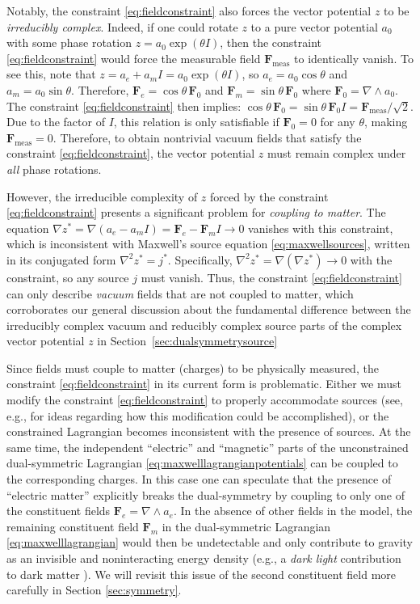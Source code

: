 \documentclass[1p,sort&compress]{elsarticle}
\numberwithin{equation}{section}
\newcommand{\bv}[1]{\mathbf{#1}}
\begin{document}
Notably, the constraint \eqref{eq:fieldconstraint} also forces the vector potential $z$ to be \emph{irreducibly complex}.  Indeed, if one could rotate $z$ to a pure vector potential $a_0$ with some phase rotation $z = a_0\exp(\theta I)$, then the constraint \eqref{eq:fieldconstraint} would force the measurable field $\bv{F}_{\text{meas}}$ to identically vanish.  To see this, note that $z = a_e + a_m I = a_0\exp(\theta I)$, so $a_e = a_0\cos\theta$ and $a_m = a_0\sin\theta$.  Therefore, $\bv{F}_e = \cos\theta\,\bv{F}_0$ and $\bv{F}_m = \sin\theta\,\bv{F}_0$ where $\bv{F}_0 = \nabla\wedge a_0$.  The constraint \eqref{eq:fieldconstraint} then implies: $\cos\theta\,\bv{F}_0 = \sin\theta\,\bv{F}_0 I = \bv{F}_{\text{meas}}/\sqrt{2}$.  Due to the factor of $I$, this relation is only satisfiable if $\bv{F}_0 = 0$ for any $\theta$, making $\bv{F}_{\text{meas}} = 0$.  Therefore, to obtain nontrivial vacuum fields that satisfy the constraint \eqref{eq:fieldconstraint}, the vector potential $z$ must remain complex under \emph{all} phase rotations.  

However, the irreducible complexity of $z$ forced by the constraint \eqref{eq:fieldconstraint} presents a significant problem for \emph{coupling to matter}.  The equation $\nabla z^* = \nabla(a_e - a_m I) = \bv{F}_e - \bv{F}_m I \to 0$ vanishes with this constraint, which is inconsistent with Maxwell's source equation \eqref{eq:maxwellsources}, written in its conjugated form $\nabla^2 z^* = j^*$.  Specifically, $\nabla^2 z^* = \nabla(\nabla z^*) \to 0$ with the constraint, so any source $j$ must vanish.  Thus, the constraint \eqref{eq:fieldconstraint} can only describe \emph{vacuum} fields that are not coupled to matter, which corroborates our general discussion about the fundamental difference between the irreducibly complex vacuum and reducibly complex source parts of the complex vector potential $z$ in Section~\ref{sec:dualsymmetrysource}

Since fields must couple to matter (charges) to be physically measured, the constraint \eqref{eq:fieldconstraint} in its current form is problematic. Either we must modify the constraint \eqref{eq:fieldconstraint} to properly accommodate sources (see, e.g., \cite{Cameron2014} for ideas regarding how this modification could be accomplished), or the constrained Lagrangian becomes inconsistent with the presence of sources. 
At the same time, the independent ``electric'' and ``magnetic'' parts of the unconstrained dual-symmetric Lagrangian \eqref{eq:maxwelllagrangianpotentials} can be coupled to the corresponding charges. In this case one can speculate that the presence of ``electric matter'' explicitly breaks the dual-symmetry by coupling to only one of the constituent fields $\bv{F}_e = \nabla \wedge a_e$.  In the absence of other fields in the model, the remaining constituent field $\bv{F}_m$ in the dual-symmetric Lagrangian \eqref{eq:maxwelllagrangian} would then be undetectable and only contribute to gravity as an invisible and noninteracting energy density (e.g., a \emph{dark light} contribution to dark matter \cite{Vasconcellos2014}).  We will revisit this issue of the second constituent field more carefully in Section \ref{sec:symmetry}.
\end{document}
